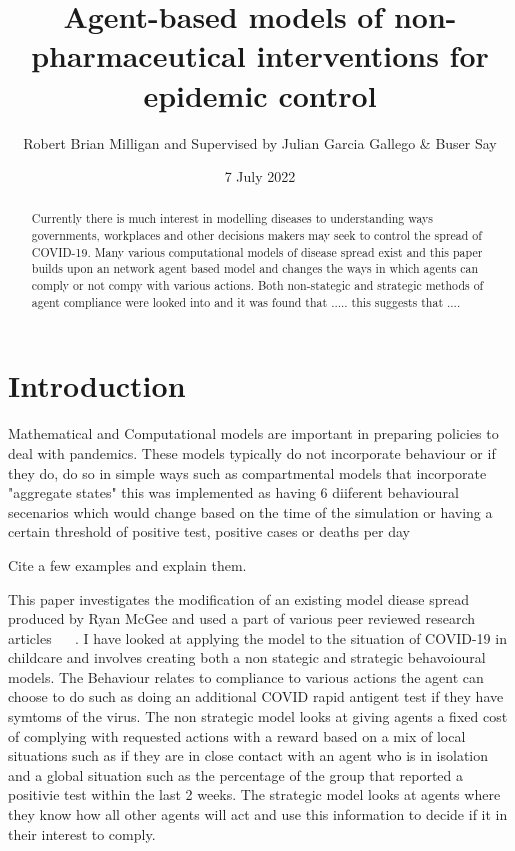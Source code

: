 \documentclass{article}
\title{Agent-based models of non-pharmaceutical interventions for epidemic control}
\author{Robert Brian Milligan and Supervised by Julian Garcia Gallego \& Buser Say}
\date{7 July 2022}
\begin{document}
\maketitle

\begin{abstract}
	Currently there is much interest in modelling diseases to understanding ways governments, workplaces and other decisions makers may seek to control the spread of COVID-19. Many various computational models of disease spread exist and this paper builds upon an network agent based model and changes the ways in which agents can comply or not compy with various actions. Both non-stategic and strategic methods of agent compliance were looked into and it was found that ..... this suggests that ....
\end{abstract}



\tableofcontents

\newpage 

\section{Introduction}

Mathematical and Computational models are important in preparing policies to deal with pandemics.
These models typically do not incorporate behaviour or if they do, do so in simple ways such as compartmental models that incorporate "aggregate states" this was implemented as having 6 diiferent behavioural secenarios which would change based on the time of the simulation or having a certain threshold of positive test, positive cases or deaths per day ~\cite{karaivanov_2020}

Cite a few examples and explain them. 

This paper investigates the modification of an existing model diease spread produced by Ryan McGee and used a part of various peer reviewed research articles ~\cite{mcgee_homburger_williams_bergstrom_zhou_2021} ~\cite{mcgee_homburger_williams_bergstrom_zhou_2021_2}. 
I have looked at applying the model to the situation of COVID-19 in childcare and involves creating both a non stategic and strategic behavoioural models. 
The Behaviour relates to compliance to various actions the agent can choose to do such as doing an additional COVID rapid antigent test if they have symtoms of the virus. The non strategic model looks at giving agents a fixed cost of complying with requested actions with a reward based on a mix of local situations such as if they are in close contact with an agent who is in isolation and a global situation such as the percentage of the group that reported a positivie test within the last 2 weeks. The strategic model looks at agents where they know how all other agents will act and use this information to decide if it in their interest to comply.
\end{document}
